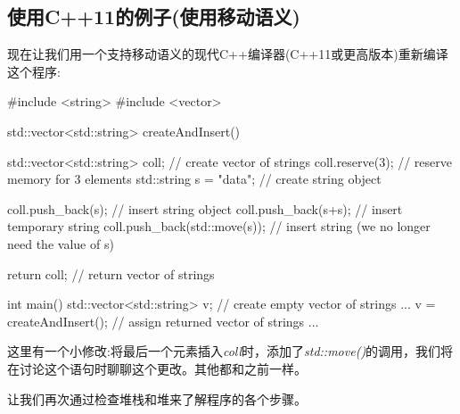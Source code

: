 \subsection{使用C++11的例子(使用移动语义)}

现在让我们用一个支持移动语义的现代C++编译器(C++11或更高版本)重新编译这个程序:

\begin{cppcode}
#include <string>
#include <vector>

std::vector<std::string> createAndInsert()
{
	std::vector<std::string> coll; // create vector of strings
	coll.reserve(3); // reserve memory for 3 elements
	std::string s = "data"; // create string object

	coll.push_back(s); // insert string object
	coll.push_back(s+s); // insert temporary string
	coll.push_back(std::move(s)); // insert string (we no longer need the value of s)

	return coll; // return vector of strings
}

int main()
{
	std::vector<std::string> v; // create empty vector of strings
	...
	v = createAndInsert(); // assign returned vector of strings
	...
}
\end{cppcode}

这里有一个小修改:将最后一个元素插入\textit{coll}时，添加了\textit{std::move()}的调用，我们将在讨论这个语句时聊聊这个更改。其他都和之前一样。

让我们再次通过检查堆栈和堆来了解程序的各个步骤。

